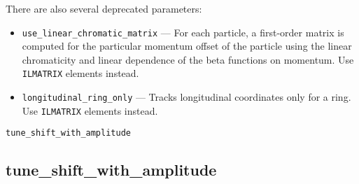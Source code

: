 \documentclass[11pt]{article}
\begin{document}
There are also several deprecated parameters:
\begin{itemize}
\item \verb|use_linear_chromatic_matrix| --- For each particle, a first-order
matrix is computed for the particular momentum offset 
of the particle using the linear chromaticity and linear dependence of 
the beta functions on momentum. Use \verb|ILMATRIX| elements instead.
\item \verb|longitudinal_ring_only| --- Tracks longitudinal coordinates only
for a ring.  Use \verb|ILMATRIX| elements instead.
\end{itemize}

\newpage
\begin{center}{\Large\verb|tune_shift_with_amplitude|}\end{center}
\subsection{tune\_shift\_with\_amplitude \label{subsec:tuneshiftwithamplitude}}
\end{document}
